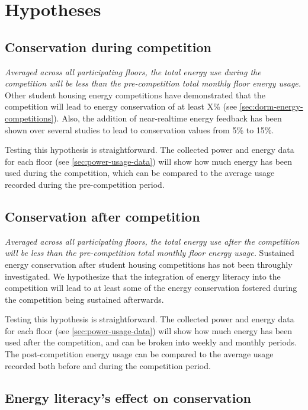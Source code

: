 \section{Hypotheses}

\subsection{Conservation during competition}

\emph{Averaged across all participating floors, the total energy use during the competition will be less than the pre-competition total monthly floor energy usage.} Other student housing energy competitions have demonstrated that the competition will lead to energy conservation of at least X\% (see \autoref{sec:dorm-energy-competitions}). Also, the addition of near-realtime energy feedback has been shown over several studies to lead to conservation values from 5\% to 15\%.

Testing this hypothesis is straightforward. The collected power and energy data for each floor (see \autoref{sec:power-usage-data}) will show how much energy has been used during the competition, which can be compared to the average usage recorded during the pre-competition period.

\subsection{Conservation after competition}

\emph{Averaged across all participating floors, the total energy use after the competition will be less than the pre-competition total monthly floor energy usage.} Sustained energy conservation after student housing competitions has not been throughly investigated. We hypothesize that the integration of energy literacy into the competition will lead to at least some of the energy conservation fostered during the competition being sustained afterwards.

Testing this hypothesis is straightforward. The collected power and energy data for each floor (see \autoref{sec:power-usage-data}) will show how much energy has been used after the competition, and can be broken into weekly and monthly periods. The post-competition energy usage can be compared to the average usage recorded both before and during the competition period.

\subsection{Energy literacy's effect on conservation}

